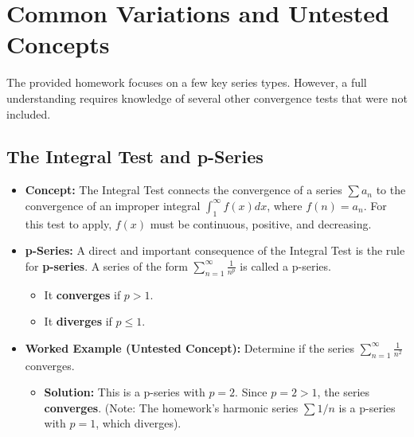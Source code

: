 \documentclass{article}
\begin{document}
\section{Common Variations and Untested Concepts}
The provided homework focuses on a few key series types. However, a full understanding requires knowledge of several other convergence tests that were not included.

\subsection{The Integral Test and p-Series}
\begin{itemize}
    \item \textbf{Concept:} The Integral Test connects the convergence of a series $\sum a_n$ to the convergence of an improper integral $\int_1^\infty f(x) dx$, where $f(n)=a_n$. For this test to apply, $f(x)$ must be continuous, positive, and decreasing.
    \item \textbf{p-Series:} A direct and important consequence of the Integral Test is the rule for \textbf{p-series}. A series of the form $\sum_{n=1}^{\infty} \frac{1}{n^p}$ is called a p-series.
        \begin{itemize}
            \item It \textbf{converges} if $p > 1$.
            \item It \textbf{diverges} if $p \le 1$.
        \end{itemize}
    \item \textbf{Worked Example (Untested Concept):} Determine if the series $\sum_{n=1}^{\infty} \frac{1}{n^2}$ converges.
    \begin{itemize}
        \item \textbf{Solution:} This is a p-series with $p=2$. Since $p=2 > 1$, the series \textbf{converges}. (Note: The homework's harmonic series $\sum 1/n$ is a p-series with $p=1$, which diverges).
    \end{itemize}
\end{itemize}
\end{document}
